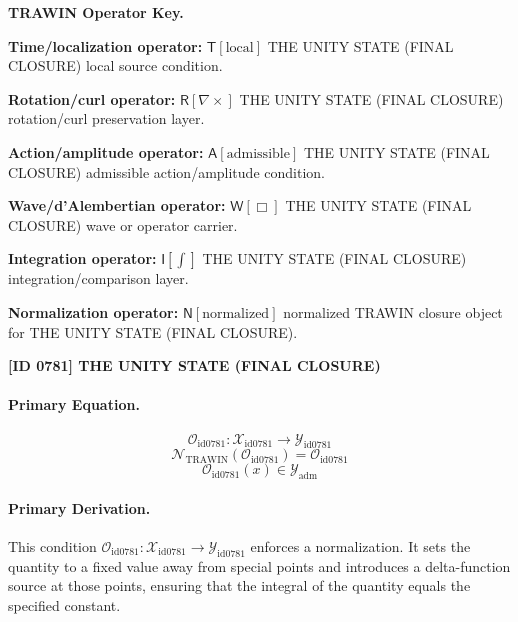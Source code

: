 \par\vspace{0.45\baselineskip}
\noindent\begin{minipage}[t]{\linewidth}
\begingroup
\small
\raggedright
\textbf{TRAWIN Operator Key.}\par
\noindent\textbf{Time/localization operator:} $\mathsf{T}\!\left[\mathrm{local}\right]$ THE UNITY STATE (FINAL CLOSURE) local source condition.\par
\noindent\textbf{Rotation/curl operator:} $\mathsf{R}\!\left[\nabla\times\right]$ THE UNITY STATE (FINAL CLOSURE) rotation/curl preservation layer.\par
\noindent\textbf{Action/amplitude operator:} $\mathsf{A}\!\left[\mathrm{admissible}\right]$ THE UNITY STATE (FINAL CLOSURE) admissible action/amplitude condition.\par
\noindent\textbf{Wave/d'Alembertian operator:} $\mathsf{W}\!\left[\Box\right]$ THE UNITY STATE (FINAL CLOSURE) wave or operator carrier.\par
\noindent\textbf{Integration operator:} $\mathsf{I}\!\left[\int\right]$ THE UNITY STATE (FINAL CLOSURE) integration/comparison layer.\par
\noindent\textbf{Normalization operator:} $\mathsf{N}\!\left[\mathrm{normalized}\right]$ normalized TRAWIN closure object for THE UNITY STATE (FINAL CLOSURE).\par
\endgroup
\end{minipage}

\clearpage
\noindent\textbf{[ID 0781] THE UNITY STATE (FINAL CLOSURE)}\par
\vspace{0.35em}
\paragraph{Primary Equation.}
\[
\mathcal{O}_{\mathrm{id0781}}:\mathcal{X}_{\mathrm{id0781}}\longrightarrow\mathcal{Y}_{\mathrm{id0781}}
\]
\[
\mathcal{N}_{\mathrm{TRAWIN}}(\mathcal{O}_{\mathrm{id0781}})=\mathcal{O}_{\mathrm{id0781}}
\]
\[
\mathcal{O}_{\mathrm{id0781}}(x)\in\mathcal{Y}_{\mathrm{adm}}
\]

\paragraph{Primary Derivation.}
This condition \( \mathcal{O}_{\mathrm{id0781}}:\mathcal{X}_{\mathrm{id0781}}\longrightarrow\mathcal{Y}_{\mathrm{id0781}} \) enforces a normalization. It sets the quantity to a fixed value away from special points and introduces a delta-function source at those points, ensuring that the integral of the quantity equals the specified constant.
